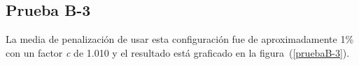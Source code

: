 
\subsection{Prueba B-3}

La media de penalización de usar esta configuración fue de aproximadamente 1\% con un factor \textit{c} de 1.010 y el resultado está graficado en la figura~(\ref{pruebaB-3}).




